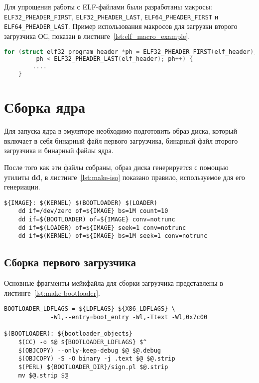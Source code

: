 Для упрощения работы с ELF-файлами были разработаны макросы: \texttt{ELF32\_PHEADER\_FIRST},
\texttt{ELF32\_PHEADER\_LAST}, \texttt{ELF64\_PHEADER\_FIRST} и \texttt{ELF64\_PHEADER\_LAST}.
Пример использования макросов для загрузки второго загрузчика ОС, показан в листинге~\ref{lst:elf_macro_example}.

\begin{lstlisting}[language=C,
caption={Пример использования макросов для работы с ELF-файлами},
label={lst:elf_macro_example}]
	for (struct elf32_program_header *ph = ELF32_PHEADER_FIRST(elf_header);
	     ph < ELF32_PHEADER_LAST(elf_header); ph++) {
		....
	}
\end{lstlisting}

\section{Сборка ядра}
Для запуска ядра в эмуляторе необходимо подготовить образ диска, который включает в себя
бинарный файл первого загрузчика, бинарный файл второго загрузчика и бинарный файлы ядра.

После того как эти файлы собраны, образ диска генерируется с помощью утилиты \textbf{dd},
в листинге~\ref{lst:make-iso} показано правило, используемое для его генериации.

\begin{lstlisting}[language=Make, caption={Правило для генерации образа диска}, label={lst:make-iso}]
${IMAGE}: $(KERNEL) $(BOOTLOADER) $(LOADER)
	dd if=/dev/zero of=${IMAGE} bs=1M count=10
	dd if=$(BOOTLOADER) of=${IMAGE} conv=notrunc
	dd if=$(LOADER) of=${IMAGE} seek=1 conv=notrunc
	dd if=$(KERNEL) of=${IMAGE} bs=1M seek=1 conv=notrunc
\end{lstlisting}

\subsection{Сборка первого загрузчика}
Основные фрагменты мейкфайла для сборки загрузчика представлены в листинге~\ref{lst:make-bootloader}.

\begin{lstlisting}[language=Make, caption={Фрагмент мейкфайла для сборки первого загрузчика}, label={lst:make-bootloader}]
BOOTLOADER_LDFLAGS = ${LDFLAGS} ${X86_LDFLAGS} \
		     -Wl,--entry=boot_entry -Wl,-Ttext -Wl,0x7c00

$(BOOTLOADER): ${bootloader_objects}
	$(CC) -o $@ ${BOOTLOADER_LDFLAGS} $^
	$(OBJCOPY) --only-keep-debug $@ $@.debug
	$(OBJCOPY) -S -O binary -j .text $@ $@.strip
	$(PERL) ${BOOTLOADER_DIR}/sign.pl $@.strip
	mv $@.strip $@
\end{lstlisting}

